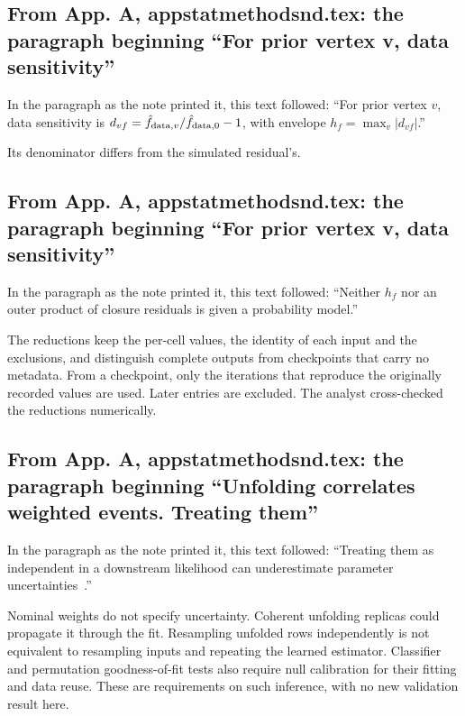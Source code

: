 \subsection{From App. A, appstatmethodsnd.tex: the paragraph beginning ``For prior vertex v, data sensitivity''}
In the paragraph as the note printed it, this text followed: ``For prior vertex $v$, data sensitivity is $d_{vf}=\hat f_{{\rm data},v}/\hat f_{{\rm data},0}-1$, with envelope $h_f=\max_v|d_{vf}|$.''\par
Its denominator differs from the simulated residual's.

\subsection{From App. A, appstatmethodsnd.tex: the paragraph beginning ``For prior vertex v, data sensitivity''}
In the paragraph as the note printed it, this text followed: ``Neither $h_f$ nor an outer product of closure residuals is given a probability model.''\par
The reductions keep the per-cell values, the identity of each input and the exclusions, and distinguish complete outputs from checkpoints that carry no metadata. From a checkpoint, only the iterations that reproduce the originally recorded values are used. Later entries are excluded. The analyst cross-checked the reductions numerically.

\subsection{From App. A, appstatmethodsnd.tex: the paragraph beginning ``Unfolding correlates weighted events. Treating them''}
In the paragraph as the note printed it, this text followed: ``Treating them as independent in a downstream likelihood can underestimate parameter uncertainties~\cite{Desai:2025correlated}.''\par
Nominal weights do not specify uncertainty. Coherent unfolding replicas could propagate it through the fit. Resampling unfolded rows independently is not equivalent to resampling inputs and repeating the learned estimator. Classifier and permutation goodness-of-fit tests also require null calibration for their fitting and data reuse. These are requirements on such inference, with no new validation result here.

